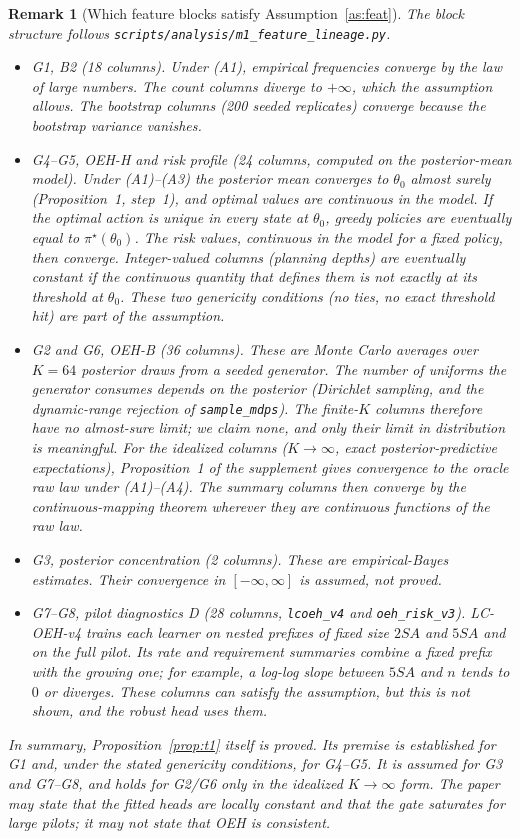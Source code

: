\documentclass[10pt]{article}
\newtheorem{remark}{Remark}
\begin{document}
\begin{remark}[Which feature blocks satisfy Assumption~\ref{as:feat}]
The block structure follows \texttt{scripts/analysis/m1\_feature\_lineage.py}.
\begin{itemize}
\item \emph{G1, B2 (18 columns).} Under (A1), empirical frequencies converge by the law of large numbers. The count columns diverge to $+\infty$, which the assumption allows. The bootstrap columns (200 seeded replicates) converge because the bootstrap variance vanishes.
\item \emph{G4--G5, OEH-H and risk profile (24 columns, computed on the posterior-mean model).} Under (A1)--(A3) the posterior mean converges to $\theta_0$ almost surely (Proposition~1, step~1), and optimal values are continuous in the model. If the optimal action is unique in every state at $\theta_0$, greedy policies are eventually equal to $\pi^\star(\theta_0)$. The risk values, continuous in the model for a fixed policy, then converge. Integer-valued columns (planning depths) are eventually constant if the continuous quantity that defines them is not exactly at its threshold at $\theta_0$. These two genericity conditions (no ties, no exact threshold hit) are part of the assumption.
\item \emph{G2 and G6, OEH-B (36 columns).} These are Monte Carlo averages over $K=64$ posterior draws from a seeded generator. The number of uniforms the generator consumes depends on the posterior (Dirichlet sampling, and the dynamic-range rejection of \texttt{sample\_mdps}). The finite-$K$ columns therefore have no almost-sure limit; we claim none, and only their limit in distribution is meaningful. For the idealized columns ($K\to\infty$, exact posterior-predictive expectations), Proposition~1 of the supplement gives convergence to the oracle raw law under (A1)--(A4). The summary columns then converge by the continuous-mapping theorem wherever they are continuous functions of the raw law.
\item \emph{G3, posterior concentration (2 columns).} These are empirical-Bayes estimates. Their convergence in $[-\infty,\infty]$ is assumed, not proved.
\item \emph{G7--G8, pilot diagnostics D (28 columns, \texttt{lcoeh\_v4} and \texttt{oeh\_risk\_v3}).} LC-OEH-v4 trains each learner on nested prefixes of fixed size $2SA$ and $5SA$ and on the full pilot. Its rate and requirement summaries combine a fixed prefix with the growing one; for example, a log-log slope between $5SA$ and $n$ tends to $0$ or diverges. These columns can satisfy the assumption, but this is not shown, and the robust head uses them.
\end{itemize}

In summary, Proposition~\ref{prop:t1} itself is proved. Its premise is established for G1 and, under the stated genericity conditions, for G4--G5. It is assumed for G3 and G7--G8, and holds for G2/G6 only in the idealized $K\to\infty$ form. The paper may state that the fitted heads are locally constant and that the gate saturates for large pilots; it may \emph{not} state that OEH is consistent.
\end{remark}
\end{document}
